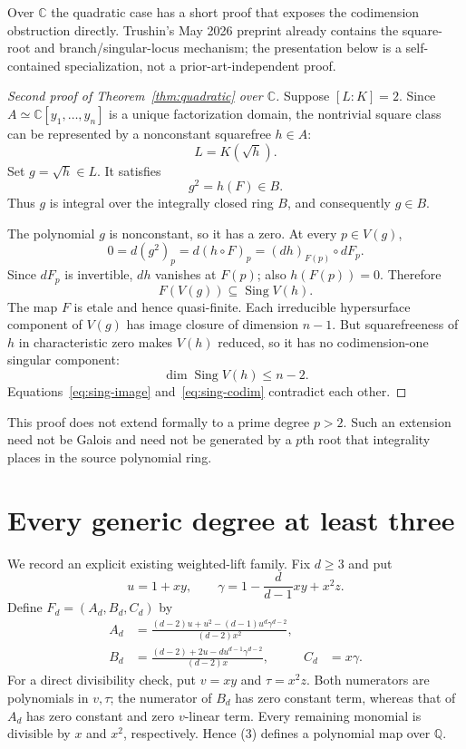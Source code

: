 \documentclass[11pt]{article}
\theoremstyle{remark}
\newcommand{\C}{\mathbb C}
\newcommand{\Sing}{\operatorname{Sing}}
\begin{document}
Over $\C$ the quadratic case has a short proof that exposes the codimension
obstruction directly. Trushin's May 2026 preprint already contains the
square-root and branch/singular-locus mechanism; the presentation below is a
self-contained specialization, not a prior-art-independent proof.

\begin{proof}[Second proof of Theorem~\ref{thm:quadratic} over $\C$]
Suppose $[L:K]=2$.  Since
$A\simeq\C[y_1,\ldots,y_n]$ is a unique factorization domain, the nontrivial
square class can be represented by a nonconstant squarefree $h\in A$:
\[
 L=K(\sqrt h).
\]
Set $g=\sqrt h\in L$.  It satisfies
\[
 g^2=h(F)\in B.
\]
Thus $g$ is integral over the integrally closed ring $B$, and consequently
$g\in B$.

The polynomial $g$ is nonconstant, so it has a zero.  At every $p\in V(g)$,
\[
 0=d(g^2)_p=d(h\circ F)_p=(dh)_{F(p)}\circ dF_p.
\]
Since $dF_p$ is invertible, $dh$ vanishes at $F(p)$; also $h(F(p))=0$.
Therefore
\begin{equation}
 F(V(g))\subseteq \Sing V(h).                         \label{eq:sing-image}
\end{equation}
The map $F$ is etale and hence quasi-finite.  Each irreducible hypersurface
component of $V(g)$ has image closure of dimension $n-1$.  But squarefreeness
of $h$ in characteristic zero makes $V(h)$ reduced, so it has no
codimension-one singular component:
\begin{equation}
 \dim\Sing V(h)\leq n-2.                              \label{eq:sing-codim}
\end{equation}
Equations~\eqref{eq:sing-image} and~\eqref{eq:sing-codim} contradict each
other.
\end{proof}

This proof does not extend formally to a prime degree $p>2$.  Such an
extension need not be Galois and need not be generated by a $p$th root that
integrality places in the source polynomial ring.

\section{Every generic degree at least three}

We record an explicit existing weighted-lift family.  Fix $d\geq3$ and put
\[
 u=1+xy,\qquad
 \gamma=1-\frac d{d-1}xy+x^2z.
\]
Define $F_d=(A_d,B_d,C_d)$ by
\begin{align*}
 A_d&=\frac{(d-2)u+u^2-(d-1)u^d\gamma^{d-2}}
              {(d-2)x^2},\\
 B_d&=\frac{(d-2)+2u-du^{d-1}\gamma^{d-2}}
              {(d-2)x},&
 C_d&=x\gamma.                                       \tag{3}
\end{align*}
For a direct divisibility check, put $v=xy$ and $\tau=x^2z$.  Both numerators
are polynomials in $v,\tau$; the numerator of $B_d$ has zero constant term,
whereas that of $A_d$ has zero constant and zero $v$-linear term.  Every
remaining monomial is divisible by $x$ and $x^2$, respectively.  Hence (3)
defines a polynomial map over $\mathbb Q$.
\end{document}
